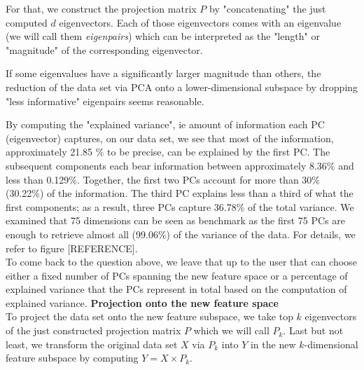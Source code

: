 
For that, we construct the projection matrix \( P \) by "concatenating" the just computed \( d \) eigenvectors. Each of those eigenvectors comes with an eigenvalue (we will call them \textit{eigenpairs}) which can be interpreted as the "length" or "magnitude" of the corresponding eigenvector. 

If some eigenvalues have a significantly larger magnitude than others, the reduction of the data set via PCA onto a lower-dimensional subspace by dropping "less informative" eigenpairs seems reasonable.

By computing the "explained variance", ie amount of information each PC (eigenvector) captures, on our data set, we see that most of the information, approximately 21.85 \% to be precise, can be explained by the first PC. The subsequent components each bear information between approximately 8.36\% and less than 0.129\%. Together, the first two PCs account for more than 30\% (30.22\%) of the information. The third PC explains less than a third of what the first components; as a result, three PCs capture 36.78\% of the total variance. We examined that 75 dimensions can be seen as benchmark as the first 75 PCs are enough to retrieve almost all (99.06\%) of the variance of the data. For details, we refer to figure [REFERENCE]. \\


To come back to the question above, we leave that up to the user that can choose either a fixed number of PCs spanning the new feature space or a percentage of explained variance that the PCs represent in total based on the computation of explained variance.
\newline
%
\textbf{Projection onto the new feature space}\\
To project the data set onto the new feature subspace, we take top \( k \) eigenvectors of the just constructed projection matrix \( P \) which we will call \( P_{k} \).
Last but not least, we transform the original data set \( X \) via \( P_{k} \) into \( Y \) in the new \(k\)-dimensional feature subspace by computing \( Y = X \times P_{k} \).

